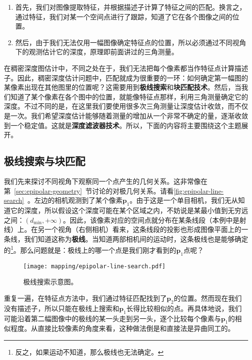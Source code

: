 \begin{enumerate}
	\item 首先，我们对图像提取特征，并根据描述子计算了特征之间的匹配。换言之，通过特征，我们对某一个空间点进行了跟踪，知道了它在各个图像之间的位置。
	\item 然后，由于我们无法仅用一幅图像确定特征点的位置，所以必须通过不同视角下的观测估计它的深度，原理即前面讲过的三角测量。
\end{enumerate}

在稠密深度图估计中，不同之处在于，我们无法把每个像素都当作特征点计算描述子。因此，稠密深度估计问题中，匹配就成为很重要的一环：如何确定第一幅图的某像素出现在其他图里的位置呢？这需要用到\textbf{极线搜索}和\textbf{块匹配技术}\textsuperscript{\cite{Pizzoli2014}}。然后，当我们知道了某个像素在各个图中的位置，就能像特征点那样，利用三角测量确定它的深度。不过不同的是，在这里我们要使用很多次三角测量让深度估计收敛，而不仅是一次。我们希望深度估计能够随着测量的增加从一个非常不确定的量，逐渐收敛到一个稳定值。这就是\textbf{深度滤波器技术}。所以，下面的内容将主要围绕这个主题展开。

\subsection{极线搜索与块匹配}

我们先来探讨不同视角下观察同一个点产生的几何关系。这非常像在第~\ref{sec:epipolar-geometry}~节讨论的对极几何关系。请看\autoref{fig:epipolar-line-search}~。左边的相机观测到了某个像素$\bm{p}_1$。由于这是一个单目相机，我们无从知道它的深度，所以假设这个深度可能在某个区域之内，不妨说是某最小值到无穷远之间：$(d_\mathrm{min}, +\infty)$。因此，该像素对应的空间点就分布在某条线段（本例中是射线）上。在另一个视角（右侧相机）看来，这条线段的投影也形成图像平面上的一条线，我们知道这称为\textbf{极线}。当知道两部相机间的运动时，这条极线也是能够确定的\footnote{反之，如果运动不知道，那么极线也无法确定。}。那么问题就是：极线上的哪一个点是我们刚才看到的$\bm{p}_1$点呢？

\begin{figure}[!htp]
	\centering
	\texttt{[image: mapping/epipolar-line-search.pdf]}
	\caption{极线搜索示意图。}
	\label{fig:epipolar-line-search}
\end{figure}

\clearpage
重复一遍，在特征点方法中，我们通过特征匹配找到了$\bm{p}_2$的位置。然而现在我们没有描述子，所以只能在极线上搜索和$\bm{p}_1$长得比较相似的点。再具体地说，我们可能沿着第二幅图像中的极线的某一头走到另一头，逐个比较每个像素与$\bm{p}_1$的相似程度。从直接比较像素的角度来看，这种做法倒是和直接法是异曲同工的。

